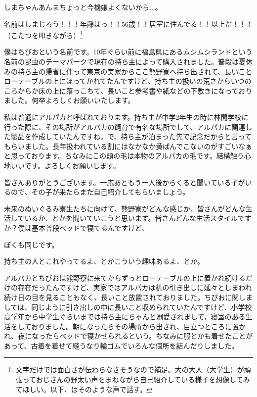 \documentclass[9pt,4aj]{jsarticle}
\begin{document}
\begin{multicols}{2}
しまちゃんあんまちょっと今機嫌よくないから...。

{\large 名前はしまじろう！！！年齢はっ！！56歳！！居室に住んでる！！以上だ！！！}（こたつを叩きながら）\footnote{文字だけでは面白さが伝わらなさそうなので補足。大の大人（大学生）が頑張っておじさんの野太い声をまねながら自己紹介している様子を想像してみてほしい。以下、はそのような声で話す。}

僕はちびおという名前です。10年ぐらい前に福島県にあるムシムシランドという名前の昆虫のテーマパークで現在の持ち主によって購入されました。普段は夏休みの持ち主の帰省に伴って東京の実家からここ熊野寮へ持ち出されて、長いことローテーブルの上にほってかれてたんですけど、持ち主の扱いの荒さからいつのころからか床の上に落っこちて、長いこと参考書や紙などの下敷きになっておりました。何卒よろしくお願いいたします。

私は普通にアルパカと呼ばれております。持ち主が中学2年生の時に林間学校に行った際に、その場所がアルパカの飼育で有名な場所でして、アルパカに関連した製品を作成していたんですね。で、持ち主が泊まった先で記念だからと言ってもらいました。長年扱われている割にはなかなか黄ばんでこないのがすごいなぁと思っております。ちなみにこの頭の毛は本物のアルパカの毛です。結構触り心地いいです。よろしくお願いします。

皆さんありがとうございます。一応あともう一人後からくると聞いている子がいるので、その子が来たらまた自己紹介してもらいましょう。

未来のぬいぐるみ寮生たちに向けて、熊野寮がどんな感じか、皆さんがどんな生活しているか、とかを聞いていこうと思います。皆さんどんな生活スタイルですか？僕は基本普段ベッドで寝てるんですけど、

ぼくも同じです。

持ち主の人とこれやってるよ、とかこういう趣味あるよ、とか。

アルパカとちびおは熊野寮に来てからずっとローテーブルの上に置かれ続けるだけの存在だったんですけど、実家ではアルパカは机の引き出しに延々としまわれ続け日の目を見ることもなく、長いこと放置されておりました。ちびおに関しましては、同じように引き出しの中に長いこと収められていたんですけど、小学校高学年から中学生ぐらいまでは持ち主にちゃんと溺愛されまして，寝室のある生活をしておりました。朝になったらその場所から出され、目立つところに置かれ、夜になったらベッドで寝かせられるという。ちなみに服とかも着せたことがあって、古着を着せて縫うなり輪ゴムでいろんな個所を結んだりしました。


\end{multicols}
\end{document}
